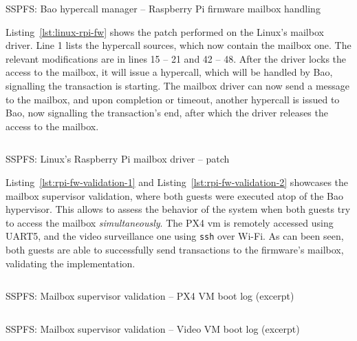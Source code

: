 \begin{longlisting}
\centering
\inputminted[]{c}{./listing/hypercall.c}
\caption{SSPFS: Bao hypercall manager -- Raspberry Pi firmware mailbox handling}
\label{lst:bao-hypercall}
\end{longlisting}

Listing~\ref{lst:linux-rpi-fw} shows the patch performed on the Linux's mailbox
driver. Line 1 lists the hypercall sources, which now contain the mailbox
one. The relevant modifications are in lines 15 -- 21 and 42 -- 48. After
the driver locks the access to the mailbox, it will issue a hypercall, which
will be handled by Bao, signalling the transaction is starting. The mailbox
driver can now send a message to the mailbox, and upon completion or timeout,
another hypercall is issued to Bao, now signalling the transaction's end, after
which the driver releases the access to the mailbox.

\begin{longlisting}
\centering
\inputminted[]{c}{./listing/linux-rpi-fw.c}
\caption{SSPFS: Linux's Raspberry Pi mailbox driver -- patch}
\label{lst:linux-rpi-fw}
\end{longlisting}

Listing~\ref{lst:rpi-fw-validation-1} and Listing~\ref{lst:rpi-fw-validation-2} showcases the mailbox supervisor validation,
where both guests were executed atop of the Bao hypervisor. This allows to
assess the behavior of the system when both guests try to access the mailbox
\emph{simultaneously}. The PX4 \gls{vm} is remotely accessed using UART5, and the
video surveillance one using \texttt{ssh} over Wi-Fi. As can been seen, both
guests are able to successfully send transactions to the firmware's mailbox,
validating the implementation.

\begin{longlisting}
\centering
\inputminted[]{kconfig}{./listing/rpi-fw-validation-1.txt}
\caption{SSPFS: Mailbox supervisor validation -- PX4 VM boot log (excerpt)}
\label{lst:rpi-fw-validation-1}
\end{longlisting}

\begin{longlisting}
\centering
\inputminted[]{kconfig}{./listing/rpi-fw-validation-2.txt}
\caption{SSPFS: Mailbox supervisor validation -- Video VM boot log (excerpt)}
\label{lst:rpi-fw-validation-2}
\end{longlisting}



